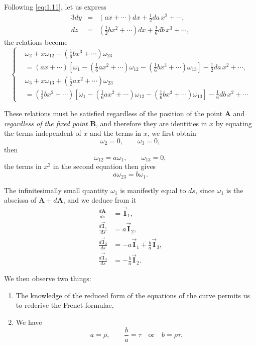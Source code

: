 \documentclass[leqno,11pt]{book}
\numberwithin{equation}{chapter}
\theoremstyle{shape1}
\theoremstyle{shapesmall}
\newcommand{\rvec}[1]{\vec{\mathbf{#1}}}
\newcommand{\ivec}{\rvec{I}}
\begin{document}
Following \eqref{eq:1.11}, let us express
\begin{alignat*}{3}
  dy&=&(ax+\cdots)dx+\frac{1}{2}da\,x^{2}+\cdots,\\
  dz&=&{}\left(\frac{1}{2}bx^{2}+\cdots\right)dx+\frac{1}{6}db\,x^{3}+\cdots,
\end{alignat*}
the relations become
\begin{equation}
  \label{eq:1.12}
  \left\{
    \begin{aligned}
      &\omega_{2}+x\omega_{12}-\left(\frac{1}{6}bx^{3}+\cdots\right)\omega_{23}\\
      &=(ax+\cdots)\left[\omega_{1}-\left(\frac{1}{6}ax^{2}+\cdots\right)\omega_{12}-\left(\frac{1}{6}bx^{3}+\cdots\right)\omega_{13}\right]-\frac{1}{2}da\,x^{2}+\cdots,\\
      &\omega_{3}+x\omega_{13}+\left(\frac{1}{2}ax^{2}+\cdots\right)\omega_{23}\\
      &=\left(\frac{1}{2}bx^{2}+\cdots\right)\left[\omega_{1}-\left(\frac{1}{6}ax^{2}+\cdots\right)\omega_{12}-\left(\frac{1}{6}bx^{3}+\cdots\right)\omega_{13}\right]-\frac{1}{6}db\,x^{2}+\cdots
    \end{aligned}
  \right.
\end{equation}

These relations must be satisfied regardless of the position of the point $\mathbf{A}$ and \emph{regardless of the fixed point $\mathbf{B}$}, and therefore they are identities in $x$ by equating the terms independent of $x$ and the terms in $x$, we first obtain
\[
\omega_{2}=0,\qquad\omega_{3}=0,
\]
then
\[
\omega_{12}=a\omega_{1},\qquad\omega_{13}=0,
\]
the terms in $x^{2}$ in the second equation then gives
\[
a\omega_{23}=b\omega_{1}.
\]

The infinitesimally small quantity $\omega_{1}$ is manifestly equal to $ds$, since $\omega_{1}$ is the abscissa of $\mathbf{A}+d\mathbf{A}$, and we deduce from it
\begin{align*}
  \frac{d\mathbf{A}}{ds}&=\ivec_{1},\\
  \frac{d\ivec_{1}}{ds}&=a{\ivec_{2}},\\
  \frac{d\ivec_{2}}{ds}&=-a{\ivec_{1}}+\frac{b}{a}\ivec_{3},\\
  \frac{d\ivec_{3}}{ds}&=-\frac{b}{a}{\ivec_{2}}.
\end{align*}

We then observe two things:
\begin{enumerate}
\item The knowledge of the reduced form of the equations of the curve permits us to rederive the Frenet formulae,
\item We have
\[
a=\rho,\qquad\frac{b}{a}=\tau \quad\text{or}\quad b=\rho\tau.
\]
\end{enumerate}
\end{document}
